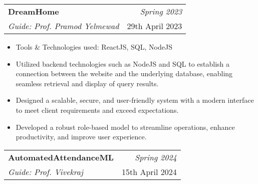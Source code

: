 \documentclass[a4paper,11pt]{article}
\makeatletter
\newcommand{\resumeProject}[4]{
\vspace{0.5mm}\item
    \begin{tabular*}{0.98\textwidth}[t]{l@{\extracolsep{\fill}}r}
        \textbf{#1} & \textit{\footnotesize{#3}} \\
        \footnotesize{\textit{#2}} & \footnotesize{#4}
    \end{tabular*}
    \vspace{-2.4mm}
}
\newcommand{\resumeItemListStart}{\begin{justify}\begin{itemize}[leftmargin=3ex, rightmargin=2ex, noitemsep,labelsep=1.2mm,itemsep=0mm]\small}
\newcommand{\resumeItemListEnd}{\end{itemize}\end{justify}\vspace{-2mm}}
\makeatother
\begin{document}
    \resumeProject
      { DreamHome} %
      {Guide: Prof. Pramod Yelmewad} %
      {Spring 2023}
      {29th April 2023} %

      \resumeItemListStart
        \item {Tools \& Technologies used: ReactJS, SQL, NodeJS}
        \item {Utilized backend technologies such as NodeJS and SQL to establish a connection between the website and the underlying database, enabling seamless retrieval and display of query results.}
        \item {Designed a scalable, secure, and user-friendly system with a modern interface to meet client requirements and exceed expectations.}
        \item {Developed a robust role-based model to streamline operations, enhance productivity, and improve user experience.}
        
    \resumeItemListEnd
    \vspace{-2mm}



    \resumeProject
      {AutomatedAttendanceML} %
      {Guide: Prof. Vivekraj} %
      {Spring 2024}
      {15th April 2024} %
\end{document}
